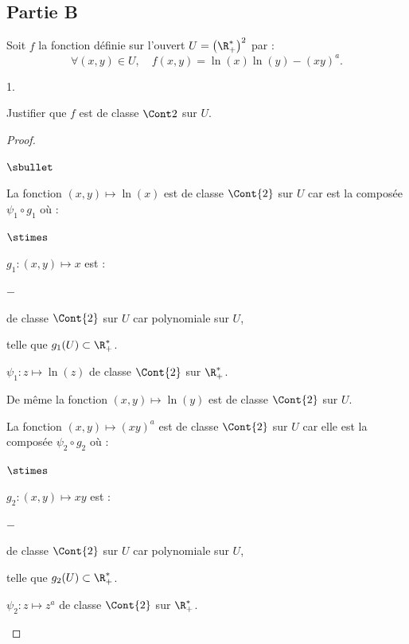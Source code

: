 \documentclass[11pt]{article}%
\begin{document}
\subsection*{Partie B}
\noindent
Soit $f$ la fonction définie sur l'ouvert $U=\left(\R_+^*\right)^2$
par :
\[
\forall (x,y)\in U, \quad f(x,y)=\ln(x)\ln(y)-(xy)^a.
\]
\begin{noliste}{1.}
  \setcounter{enumi}{3}
\item Justifier que $f$ est de classe $\Cont 2$ sur $U$.
  
  \begin{proof}~
    \begin{noliste}{$\sbullet$}
    \item La fonction $(x,y) \mapsto \ln(x)$ est de classe $\Cont{2}$
      sur $U$ car est la composée $\psi_1 \circ g_1$ où :
      \begin{noliste}{$\stimes$}
      \item $g_1 : (x,y)\mapsto x$ est :
        \begin{noliste}{$-$}
        \item de classe $\Cont{2}$ sur $U$ car polynomiale sur $U$,
        \item telle que $g_1(U) \subset \R_+^*$.
        \end{noliste}
        
      \item $\psi_1 : z \mapsto \ln(z)$ de classe $\Cont{2}$ sur
        $\R_+^*$.
      \end{noliste}
      
    \item De même la fonction $(x,y) \mapsto \ln(y)$ est de classe
      $\Cont{2}$ sur $U$.
      
    \item La fonction $(x,y) \mapsto (xy)^a$ est de classe $\Cont{2}$
      sur $U$ car elle est la composée $\psi_2 \circ g_2$ où :
      \begin{noliste}{$\stimes$}
      \item $g_2 : (x,y) \mapsto xy$ est :
        \begin{noliste}{$-$}
        \item de classe $\Cont{2}$ sur $U$ car polynomiale sur $U$,
        \item telle que $g_2(U) \subset \R_+^*$.
        \end{noliste}
        
      \item $\psi_2 : z \mapsto z^a$ de classe $\Cont{2}$ sur
        $\R_+^*$.
      \end{noliste}
    \end{noliste}
    

\end{proof}
\end{noliste}
\end{document}

